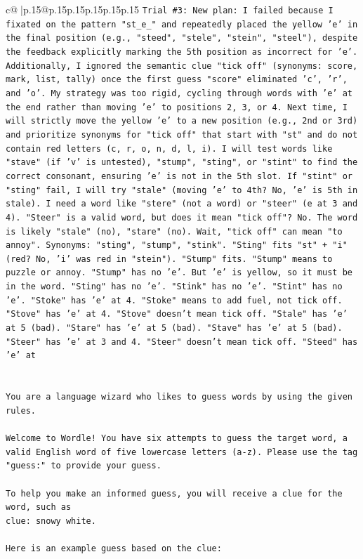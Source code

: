 \documentclass{article}
\begin{document}
{\begin{supertabular}{c@{$\;$}|p{.15\linewidth}@{}p{.15\linewidth}p{.15\linewidth}p{.15\linewidth}p{.15\linewidth}p{.15\linewidth}}
{{{\texttt{Trial \#3: New plan: I failed because I fixated on the pattern "st\_e\_" and repeatedly placed the yellow 'e' in the final position (e.g., "steed", "stele", "stein", "steel"), despite the feedback explicitly marking the 5th position as incorrect for 'e'. Additionally, I ignored the semantic clue "tick off" (synonyms: score, mark, list, tally) once the first guess "score" eliminated 'c', 'r', and 'o'. My strategy was too rigid, cycling through words with 'e' at the end rather than moving 'e' to positions 2, 3, or 4. Next time, I will strictly move the yellow 'e' to a new position (e.g., 2nd or 3rd) and prioritize synonyms for "tick off" that start with "st" and do not contain red letters (c, r, o, n, d, l, i). I will test words like "stave" (if 'v' is untested), "stump", "sting", or "stint" to find the correct consonant, ensuring 'e' is not in the 5th slot. If "stint" or "sting" fail, I will try "stale" (moving 'e' to 4th? No, 'e' is 5th in stale). I need a word like "stere" (not a word) or "steer" (e at 3 and 4). "Steer" is a valid word, but does it mean "tick off"? No. The word is likely "stale" (no), "stare" (no). Wait, "tick off" can mean "to annoy". Synonyms: "sting", "stump", "stink". "Sting" fits "st" + "i" (red? No, 'i' was red in "stein"). "Stump" fits. "Stump" means to puzzle or annoy. "Stump" has no 'e'. But 'e' is yellow, so it must be in the word. "Sting" has no 'e'. "Stink" has no 'e'. "Stint" has no 'e'. "Stoke" has 'e' at 4. "Stoke" means to add fuel, not tick off. "Stove" has 'e' at 4. "Stove" doesn't mean tick off. "Stale" has 'e' at 5 (bad). "Stare" has 'e' at 5 (bad). "Stave" has 'e' at 5 (bad). "Steer" has 'e' at 3 and 4. "Steer" doesn't mean tick off. "Steed" has 'e' at} \\
\\ 
\\ 
\texttt{You are a language wizard who likes to guess words by using the given rules.} \\
\\ 
\texttt{Welcome to Wordle! You have six attempts to guess the target word, a valid English word of five lowercase letters (a{-}z). Please use the tag "guess:" to provide your guess.} \\
\\ 
\texttt{To help you make an informed guess, you will receive a clue for the word, such as} \\
\texttt{clue: snowy white.} \\
\\ 
\texttt{Here is an example guess based on the clue: } \\
}}}
\end{supertabular}}
\end{document}
